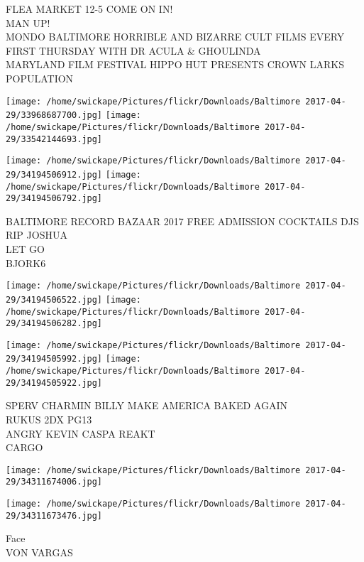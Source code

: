 \documentclass[10pt,letterpaper]{article}
\begin{document}
FLEA MARKET 12{-}5 COME ON IN!\\
MAN UP!\\
MONDO BALTIMORE HORRIBLE AND BIZARRE CULT FILMS EVERY FIRST THURSDAY WITH DR ACULA \& GHOULINDA\\
MARYLAND FILM FESTIVAL HIPPO HUT PRESENTS CROWN LARKS POPULATION\\
\pagebreak

\texttt{[image: /home/swickape/Pictures/flickr/Downloads/Baltimore 2017-04-29/33968687700.jpg]}
\texttt{[image: /home/swickape/Pictures/flickr/Downloads/Baltimore 2017-04-29/33542144693.jpg]}

\texttt{[image: /home/swickape/Pictures/flickr/Downloads/Baltimore 2017-04-29/34194506912.jpg]}
\texttt{[image: /home/swickape/Pictures/flickr/Downloads/Baltimore 2017-04-29/34194506792.jpg]}

BALTIMORE RECORD BAZAAR 2017 FREE ADMISSION COCKTAILS DJS\\
RIP JOSHUA\\
LET GO\\
BJORK6\\
\pagebreak

\texttt{[image: /home/swickape/Pictures/flickr/Downloads/Baltimore 2017-04-29/34194506522.jpg]}
\texttt{[image: /home/swickape/Pictures/flickr/Downloads/Baltimore 2017-04-29/34194506282.jpg]}

\texttt{[image: /home/swickape/Pictures/flickr/Downloads/Baltimore 2017-04-29/34194505992.jpg]}
\texttt{[image: /home/swickape/Pictures/flickr/Downloads/Baltimore 2017-04-29/34194505922.jpg]}

SPERV CHARMIN BILLY MAKE AMERICA BAKED AGAIN\\
RUKUS 2DX PG13\\
ANGRY KEVIN CASPA REAKT\\
CARGO\\
\pagebreak

\texttt{[image: /home/swickape/Pictures/flickr/Downloads/Baltimore 2017-04-29/34311674006.jpg]}

\vspace{0.25in}
\texttt{[image: /home/swickape/Pictures/flickr/Downloads/Baltimore 2017-04-29/34311673476.jpg]}

Face\\
VON VARGAS\\
\pagebreak
\end{document}
